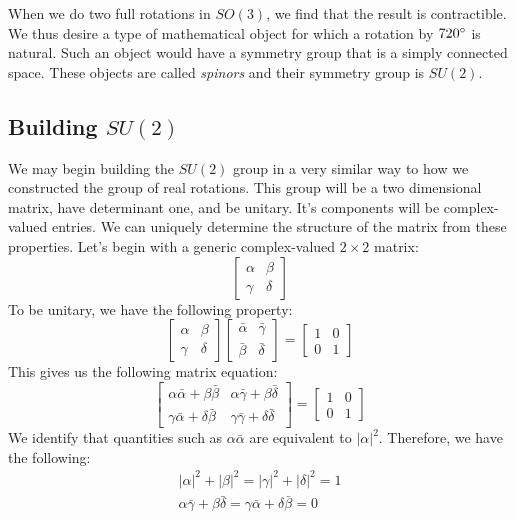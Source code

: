 When we do two full rotations in $SO(3)$, we find that the result is contractible. We thus desire a type of mathematical object for which a rotation by $720\degree$ is natural. Such an object would have a symmetry group that is a simply connected space. These objects are called \textit{spinors} and their symmetry group is $SU(2)$.

\subsection{Building $SU(2)$}

We may begin building the $SU(2)$ group in a very similar way to how we constructed the group of real rotations. This group will be a two dimensional matrix, have determinant one, and be unitary. It's components will be complex-valued entries. We can uniquely determine the structure of the matrix from these properties. Let's begin with a generic complex-valued $2\times2$ matrix:
$$\begin{bmatrix}
    \alpha&\beta\\\gamma&\delta
\end{bmatrix}$$
To be unitary, we have the following property:
$$\begin{bmatrix}
    \alpha&\beta\\\gamma&\delta
\end{bmatrix}\begin{bmatrix}
    \bar{\alpha}&\bar{\gamma}\\\bar{\beta}&\bar{\delta}
\end{bmatrix}=\begin{bmatrix}
    1&0\\0&1
\end{bmatrix}$$
This gives us the following matrix equation:
$$\begin{bmatrix}
\alpha\bar{\alpha}+\beta\bar{\beta}&\alpha\bar{\gamma}+\beta\bar{\delta}\\\gamma\bar{\alpha}+\delta\bar{\beta}&\gamma\bar{\gamma}+\delta\bar{\delta}
\end{bmatrix}=\begin{bmatrix}
    1&0\\0&1
\end{bmatrix}$$
We identify that quantities such as $\alpha\bar{\alpha}$ are equivalent to $|\alpha|^2$. Therefore, we have the following:
\begin{gather}
|\alpha|^2+ |\beta|^2=|\gamma|^2+|\delta|^2=1\\
\alpha\bar{\gamma}+\beta\bar{\delta}=\gamma\bar{\alpha}+\delta\bar{\beta}=0
\end{gather}
